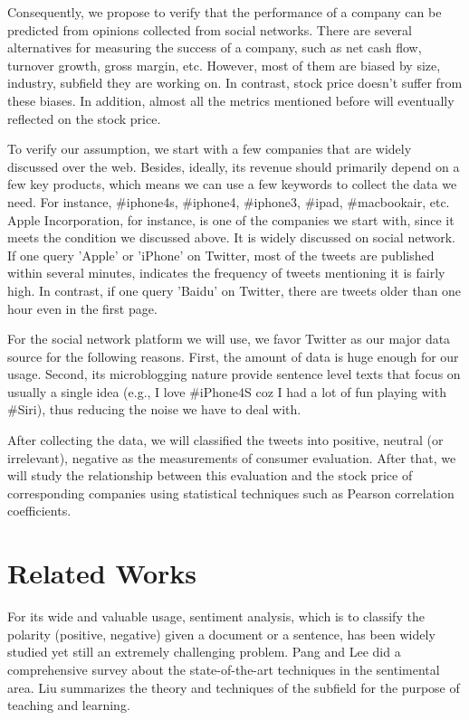 \documentclass[12pt]{article}
\begin{document}
Consequently, we propose to verify that the performance of a company can be predicted from opinions collected from social networks. There are several alternatives for measuring the success of a company, such as net cash flow, turnover growth, gross margin, etc. However, most of them are biased by size, industry, subfield they are working on. In contrast, stock price doesn't suffer from these biases. In addition, almost all the metrics mentioned before will eventually reflected on the stock price.

To verify our assumption, we start with a few companies that are widely discussed over the web. Besides, ideally, its revenue should primarily depend on a few key products, which means we can use a few keywords to collect the data we need. For instance, \#iphone4s, \#iphone4, \#iphone3, \#ipad, \#macbookair, etc. Apple Incorporation, for instance, is one of the companies we start with, since it meets the condition we discussed above. It is widely discussed on social network. If one query 'Apple' or 'iPhone' on Twitter, most of the tweets are published within several minutes, indicates the frequency of tweets mentioning it is fairly high. In contrast, if one query 'Baidu' on Twitter, there are tweets older than one hour even in the first page.

For the social network platform we will use, we favor Twitter as our major data source for the following reasons. First, the amount of data is huge enough for our usage. Second, its microblogging nature provide sentence level texts that focus on usually a single idea (e.g., I love \#iPhone4S coz I had a lot of fun playing with \#Siri), thus reducing the noise we have to deal with.

After collecting the data, we will classified the tweets into positive, neutral (or irrelevant), negative as the measurements of consumer evaluation. After that, we will study the relationship between this evaluation and the stock price of corresponding companies using statistical techniques such as Pearson correlation coefficients.

\section{Related Works}
For its wide and valuable usage, sentiment analysis, which is to classify the polarity (positive, negative) given a document or a sentence, has been widely studied yet still an extremely challenging problem. Pang and Lee \cite{Pang:08} did a comprehensive survey about the state-of-the-art techniques in the sentimental area. Liu \cite{Liu:10} summarizes the theory and techniques of the subfield for the purpose of teaching and learning.
\end{document}
